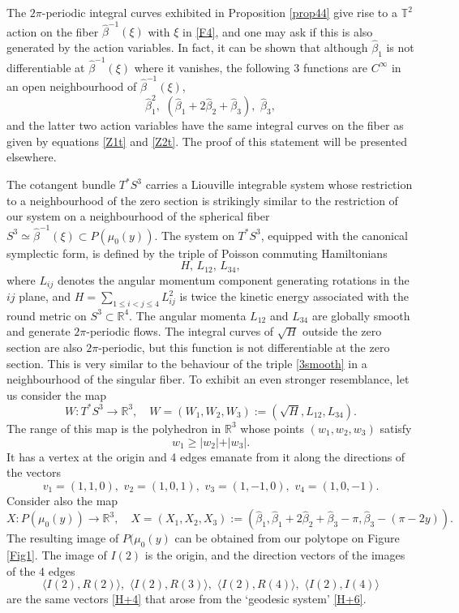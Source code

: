 \documentclass[a4paper,11pt,reqno]{amsart}
\theoremstyle{definition}
\numberwithin{equation}{section}
\newcommand{\be}{\begin{equation}}
\newcommand{\ee}{\end{equation}}
\def\bT{{\mathbb T}}                        %
\def\bR{{\mathbb R}}                        %
\begin{document}
The $2\pi$-periodic integral curves exhibited in Proposition \ref{prop44} give rise to a $\bT^2$ action on the fiber
$\hat \beta^{-1}(\xi)$ with $\xi$ in \eqref{F4}, and one may ask if this is also generated  by the action variables.
In fact, it can be shown that although $\hat \beta_1$ is not differentiable at $\hat \beta^{-1}(\xi)$  where it vanishes,
the following 3 functions are $C^\infty$ in an open neighbourhood of $\hat \beta^{-1}(\xi)$,
\be
\hat \beta_1^2,\,\,   (\hat \beta_1 + 2 \hat \beta_2 + \hat \beta_3),\,\, \hat \beta_3,
\label{3smooth}\ee
and the latter two action variables have the same integral curves  on the fiber as given by equations \eqref{Z1t} and \eqref{Z2t}.
The proof of this statement will be presented elsewhere.

The cotangent bundle $T^*S^3$ carries a Liouville integrable system whose restriction to a neighbourhood of the zero section
is strikingly similar to the restriction of our system on a neighbourhood of the spherical fiber $S^3\simeq \hat \beta^{-1}(\xi) \subset P(\mu_0(y))$.
The system on   $T^*S^3$, equipped with the canonical symplectic form, is defined
 by the  triple of Poisson commuting Hamiltonians
\be
H,\, L_{12},\, L_{34},
\label{L1234}\ee
where $L_{ij}$ denotes the angular momentum  component generating rotations in the $ij$ plane, and $H=\sum_{1\leq i<j \leq 4} L_{ij}^2$ is
twice the kinetic energy associated with the round metric on  $S^3 \subset \bR^4$.
The angular momenta $L_{12}$ and $L_{34}$ are globally smooth and generate $2\pi$-periodic flows.
The integral curves of $\sqrt{H}$  outside the zero section are also $2\pi$-periodic,
but this function is not differentiable at the zero section.
This is very similar to the behaviour of the triple \eqref{3smooth} in a neighbourhood of the singular fiber.
To exhibit an even stronger resemblance, let us consider the map
\be
W: T^* S^3 \to \bR^3, \quad
W = (W_1, W_2, W_3):= (\sqrt{H}, L_{12}, L_{34}).
\label{H+6}\ee
The range of this map \cite{K} is the polyhedron in $\bR^3$ whose points $(w_1,w_2,w_3)$ satisfy
\be
w_1 \geq \vert w_2\vert + \vert w_3 \vert.
\label{H+7}\ee
It has a vertex at the origin and 4 edges emanate from it along the directions  of the vectors
\be
v_1 = (1,1,0),\,\, v_2 = (1,0,1),\,\, v_3 = (1,-1,0),\,\, v_4 = (1,0,-1).
\label{H+4}\ee
Consider also the map
\be
X: P(\mu_0(y)) \to \bR^3,
\quad
X= (X_1, X_2, X_3):= (\hat \beta_1, \hat \beta_1 + 2 \hat \beta_2 + \hat \beta_3 - \pi, \hat \beta_3 - (\pi - 2y)).
\label{H+1}\ee
The  resulting  image of $P(\mu_0(y)$  can be obtained from our polytope on Figure \ref{Fig1}.
The image of $I(2)$ is the origin, and the direction vectors of
 the images of the 4 edges
\be
\langle I(2), R(2) \rangle,\,\, \langle I(2), R(3) \rangle,\,\, \langle I(2), R(4) \rangle,\,\, \langle I(2), I(4) \rangle
\label{H+5}\ee
are the same vectors \eqref{H+4} that arose from the `geodesic system' \eqref{H+6}.
\end{document}
